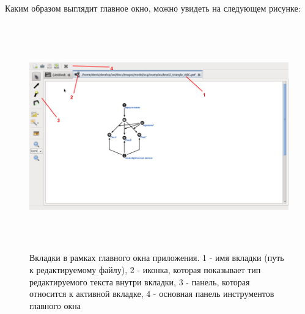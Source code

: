 Каким образом выглядит главное окно, можно увидеть на следующем рисунке:
\begin{figure}[h]
	\includegraphics[width=16.23cm, height=9.82cm]{../images/tabs.png}
	\caption{Вкладки в рамках главного окна приложения. 1 - имя вкладки (путь к редактируемому файлу), 2 - иконка, которая показывает
	тип редактируемого текста внутри вкладки, 3 - панель, которая относится к активной вкладке, 4 - основная панель инструментов главного окна}
	\label{pic_tabs}
\end{figure}

